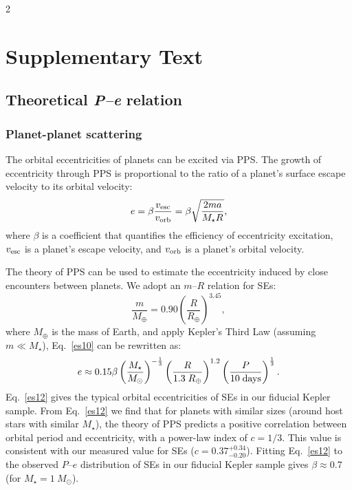 \documentclass[10pt]{article}
\begin{document}
\begin{multicols}{2}
\section*{Supplementary Text}
\subsection*{\hypertarget{s3}{Theoretical \emph{P--e} relation}}
\subsubsection*{\hypertarget{s3.1}{Planet-planet scattering}}
\noindent The orbital eccentricities of planets can be excited via PPS\cite{1996Sci...274..954R,1996Natur.384..619W}.
The growth of eccentricity through PPS is proportional to the ratio of a planet's surface escape velocity to its orbital velocity\cite{2008ApJ...686..621F,2008ApJ...686..580C}:
\begin{equation}
\label{es10}
e = \beta \frac{v_{\rm esc}}{v_{\rm orb}} = \beta \sqrt{\frac{2ma}{M_\star R}},
\end{equation}
where $\beta$ is a coefficient that quantifies the efficiency of eccentricity excitation, $v_{\rm esc}$ is a planet's escape velocity, and $v_{\rm orb}$ is a planet's orbital velocity.

The theory of PPS can be used to estimate the eccentricity induced by close encounters between planets.
We adopt an $m$--$R$ relation for SEs\cite{2020A&A...634A..43O}:
\begin{equation}
\label{es11}
\frac{m}{M_\oplus} = 0.90\left(\frac{R}{R_\oplus}\right)^{3.45},
\end{equation}
where $M_\oplus$ is the mass of Earth, and apply Kepler's Third Law (assuming $m \ll M_{\star}$), Eq.~\ref{es10} can be rewritten as:
\begin{equation}
\label{es12}
e \approx 0.15\beta \left(\frac{M_{\star}}{M_\odot}\right)^{-\frac{1}{3}} \left(\frac{R}{1.3\;R_\oplus}\right)^{1.2} \left({\frac{P}{10\;{\rm days}}}\right)^{\frac{1}{3}}.
\end{equation}
Eq.~\ref{es12} gives the typical orbital eccentricities of SEs in our fiducial Kepler sample.
From Eq.~\ref{es12} we find that for planets with similar sizes (around host stars with similar $M_{\star}$), the theory of PPS predicts a positive correlation between orbital period and eccentricity, with a power-law index of $c=1/3$.
This value is consistent with our measured value for SEs ($c=0.37^{+0.34}_{-0.20}$).
Fitting Eq.~\ref{es12} to the observed $P$--$e$ distribution of SEs in our fiducial Kepler sample gives $\beta \approx 0.7$ (for $M_{\star}=1~M_\odot$).


\end{multicols}
\end{document}
